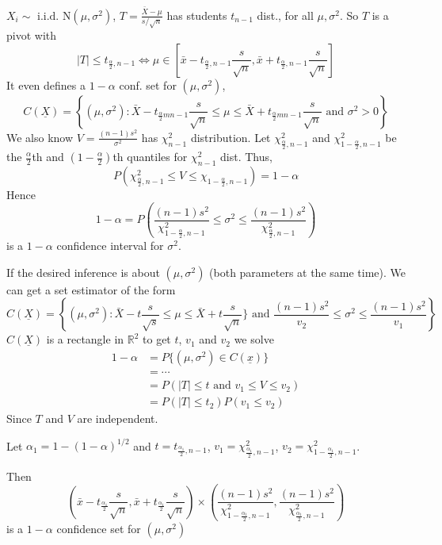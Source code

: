 \documentclass[english, 11pt]{article}
\newcommand{\lp}{\left(}
\newcommand{\rp}{\right)}
\begin{document}
\begin{exmp}
$X_i\sim\text{ i.i.d. N}(\mu, \sigma^2)$, $T=\frac{\bar{X}-\mu}{s/\sqrt{n}}$ has students $t_{n-1}$ dist., for all $\mu, \sigma^2$. So $T$ is a pivot with
$$
|T|\leqslant t_{\frac{\alpha}{2}, n-1}\Leftrightarrow\mu\in\left[\bar{x}-t_{\frac{\alpha}{2}, n-1}\frac{s}{\sqrt{n}}, \bar{x}+t_{\frac{\alpha}{2}, n-1}\frac{s}{\sqrt{n}}\right]
$$
It even defines a $1-\alpha$ conf. set for $(\mu, \sigma^2)$,
$$
C(\underline{X})=\left\{(\mu, \sigma^2):\bar{X}-t_{\frac{\alpha}{2}m n-1}\frac{s}{\sqrt{n}}\leqslant \mu\leqslant\bar{X}+t_{\frac{\alpha}{2}m n-1}\frac{s}{\sqrt{n}}\text{ and }\sigma^2>0\right\}
$$
We also know $V=\frac{(n-1)s^2}{\sigma^2}$ has $\chi_{n-1}^2$ distribution. Let $\chi^2_{\frac{\alpha}{2}, n-1}$ and $\chi^2_{1-\frac{\alpha}{2}, n-1}$ be the $\frac{\alpha}{2}$th and $\lp1-\frac{\alpha}{2}\rp$th quantiles for $\chi_{n-1}^2$ dist. Thus,
$$
P\lp\chi_{\frac{\alpha}{2}, n-1}^2\leqslant V\leqslant \chi_{1-\frac{\alpha}{2}, n-1}\rp=1-\alpha
$$
Hence 
$$
1-\alpha=P\lp\frac{(n-1)s^2}{\chi^2_{1-\frac{\alpha}{2}, n-1}}\leqslant\sigma^2\leqslant\frac{(n-1)s^2}{\chi^2_{\frac{\alpha}{2}, n-1}}\rp
$$
is a $1-\alpha$ confidence interval for $\sigma^2$.

If the desired inference is about $(\mu, \sigma^2)$ (both parameters at the same time). We can get a set estimator of the form
$$
C(\underline{X})=\left\{(\mu, \sigma^2):\bar{X}-t\frac{s}{\sqrt{s}}\leqslant\mu\leqslant\bar{X}+t\frac{s}{\sqrt{n}}\}\text{ and }\frac{(n-1)s^2}{v_2}\leqslant\sigma^2\leqslant\frac{(n-1)s^2}{v_1}\right\}
$$
$C(\underline{X})$ is a rectangle in $\mathbb{R}^2$ to get $t$, $v_1$ and $v_2$ we solve 
$$
\begin{aligned}
1-\alpha&=P\{(\mu, \sigma^2)\in C(\underline{x})\}\\
&=\cdots\\
&=P(|T|\leqslant t\text{ and }v_1\leqslant V\leqslant v_2)\\
&=P(|T|\leqslant t_2)P(v_1\leqslant v_2)
\end{aligned}
$$
Since $T$ and $V$ are independent. 

Let $\alpha_1=1-(1-\alpha)^{1/2}$ and $t=t_{\frac{\alpha_1}{2}, n-1}$, $v_1=\chi_{\frac{\alpha_1}{2}, n-1}^2$, $v_2=\chi^2_{1-\frac{\alpha_1}{2}, n-1}$.

Then 
$$
\left(\bar{x}-t_{\frac{\alpha_1}{2}}\frac{s}{\sqrt{n}}, \bar{x}+t_{\frac{\alpha_1}{2}}\frac{s}{\sqrt{n}}\right)\times\lp\frac{(n-1)s^2}{\chi^2_{1-\frac{\alpha_1}{2}, n-1}}, \frac{(n-1)s^2}{\chi^2_{\frac{\alpha_1}{2}, n-1}}\rp
$$
is a $1-\alpha$ confidence set for $(\mu, \sigma^2)$
\end{exmp}
\end{document}
